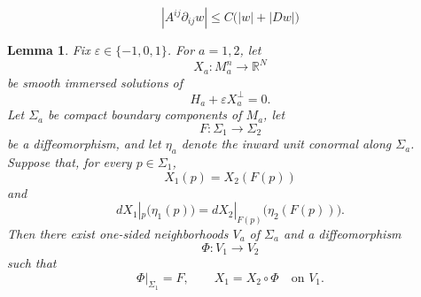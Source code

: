 \documentclass[10pt,a4paper]{amsart}
\newtheorem{lemma}{Lemma}
\begin{document}
\begin{equation}
        |A^{ij}\partial_{ij}w|
        \le C\bigl(|w|+|Dw|\bigr)
\end{equation}

\begin{lemma}\label{lem:cauchy}
Fix $\varepsilon\in\{-1,0,1\}$.  For $a=1,2$, let
$$
        X_a:M_a^n\longrightarrow\mathbb R^N
$$
be smooth immersed solutions of
$$
        H_a+\varepsilon X_a^\perp=0.
$$
Let $\Sigma_a$ be compact boundary components of $M_a$, let
$$
        F:\Sigma_1\longrightarrow\Sigma_2
$$
be a diffeomorphism, and let $\eta_a$ denote the inward unit conormal
along $\Sigma_a$.  Suppose that, for every $p\in\Sigma_1$,
$$
        X_1(p)=X_2(F(p))
$$
and
$$
        dX_1|_p\bigl(\eta_1(p)\bigr)
        =
        dX_2|_{F(p)}\bigl(\eta_2(F(p))\bigr).
$$
Then there exist one-sided neighborhoods $V_a$ of $\Sigma_a$ and a
diffeomorphism
$$
        \Phi:V_1\longrightarrow V_2
$$
such that
$$
        \Phi|_{\Sigma_1}=F,
        \qquad
        X_1=X_2\circ\Phi
        \quad\text{on }V_1.
$$


\end{lemma}
\end{document}
